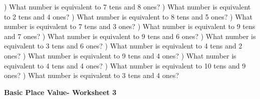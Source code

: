 \documentclass{article}%
\begin{document}
) What number is equivalent to 7 tens and 8 ones?%
\newline%
\newline%
) What number is equivalent to 2 tens and 4 ones?%
\newline%
\newline%
) What number is equivalent to 8 tens and 5 ones?%
\newline%
\newline%
) What number is equivalent to 7 tens and 3 ones?%
\newline%
\newline%
) What number is equivalent to 9 tens and 7 ones?%
\newline%
\newline%
) What number is equivalent to 9 tens and 6 ones?%
\newline%
\newline%
) What number is equivalent to 3 tens and 6 ones?%
\newline%
\newline%
) What number is equivalent to 4 tens and 2 ones?%
\newline%
\newline%
) What number is equivalent to 9 tens and 4 ones?%
\newline%
\newline%
) What number is equivalent to 4 tens and 4 ones?%
\newline%
\newline%
) What number is equivalent to 10 tens and 9 ones?%
\newline%
\newline%
) What number is equivalent to 3 tens and 4 ones?%
\newline%
\newline%
\newline%
\pagebreak%
\large%
\begin{center}%
\textbf{Basic Place Value- Worksheet 3}%
\newline%
\newline%
\newline%
\end{center} \normalsize%
\end{document}
